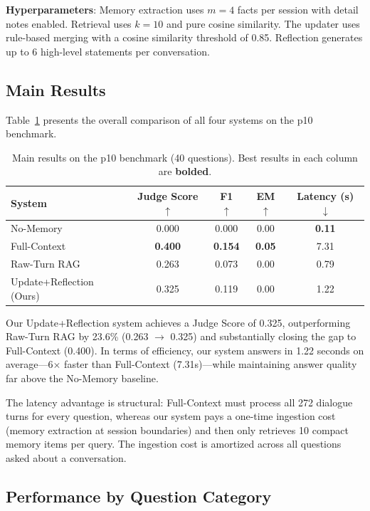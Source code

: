 \documentclass[11pt]{article}
\begin{document}
\textbf{Hyperparameters}: Memory extraction uses $m=4$ facts per session with detail notes enabled. Retrieval uses $k=10$ and pure cosine similarity. The updater uses rule-based merging with a cosine similarity threshold of 0.85. Reflection generates up to 6 high-level statements per conversation.

\subsection{Main Results}

Table~\ref{tab:main} presents the overall comparison of all four systems on the p10 benchmark.

\begin{table}[t]
\centering
\small
\begin{tabular}{lcccc}
\toprule
\textbf{System} & \textbf{Judge Score $\uparrow$} & \textbf{F1 $\uparrow$} & \textbf{EM $\uparrow$} & \textbf{Latency (s) $\downarrow$} \\
\midrule
No-Memory      & 0.000 & 0.000 & 0.00 & \textbf{0.11} \\
Full-Context   & \textbf{0.400} & \textbf{0.154} & \textbf{0.05} & 7.31 \\
Raw-Turn RAG   & 0.263 & 0.073 & 0.00 & 0.79 \\
Update+Reflection (Ours) & 0.325 & 0.119 & 0.00 & 1.22 \\
\bottomrule
\end{tabular}
\caption{Main results on the p10 benchmark (40 questions). Best results in each column are \textbf{bolded}.}
\label{tab:main}
\end{table}

Our Update+Reflection system achieves a Judge Score of 0.325, outperforming Raw-Turn RAG by 23.6\% (0.263 $\rightarrow$ 0.325) and substantially closing the gap to Full-Context (0.400). In terms of efficiency, our system answers in 1.22 seconds on average---6$\times$ faster than Full-Context (7.31s)---while maintaining answer quality far above the No-Memory baseline.

The latency advantage is structural: Full-Context must process all 272 dialogue turns for every question, whereas our system pays a one-time ingestion cost (memory extraction at session boundaries) and then only retrieves 10 compact memory items per query. The ingestion cost is amortized across all questions asked about a conversation.

\subsection{Performance by Question Category}
\end{document}
